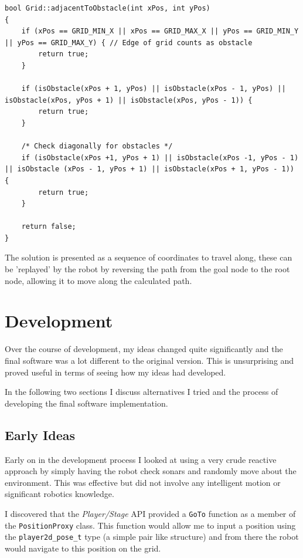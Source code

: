 \documentclass[a4paper,12pt]{article}
\begin{document}
\begin{lstlisting}
bool Grid::adjacentToObstacle(int xPos, int yPos)
{
    if (xPos == GRID_MIN_X || xPos == GRID_MAX_X || yPos == GRID_MIN_Y || yPos == GRID_MAX_Y) { // Edge of grid counts as obstacle
        return true;
    }

    if (isObstacle(xPos + 1, yPos) || isObstacle(xPos - 1, yPos) || isObstacle(xPos, yPos + 1) || isObstacle(xPos, yPos - 1)) {
        return true;
    }

    /* Check diagonally for obstacles */
    if (isObstacle(xPos +1, yPos + 1) || isObstacle(xPos -1, yPos - 1) || isObstacle (xPos - 1, yPos + 1) || isObstacle(xPos + 1, yPos - 1)) {
        return true;
    }

    return false;
}
\end{lstlisting}

The solution is presented as a sequence of coordinates to travel along, these can be 'replayed' by the robot by reversing the path from the goal node to the root node, allowing it to move along the calculated path.
\section{Development}
Over the course of development, my ideas changed quite significantly and the final software was a lot different to the original version. This is unsurprising and proved useful in terms of seeing how my ideas had developed. 

In the following two sections I discuss alternatives I tried and the process of developing the final software implementation.
\subsection{Early Ideas}
Early on in the development process I looked at using a very crude reactive approach by simply having the robot check sonars and randomly move about the environment. This was effective but did not involve any intelligent motion or significant robotics knowledge. 

I discovered that the \textit{Player/Stage} API provided a \texttt{GoTo} function as a member of the \texttt{PositionProxy} class. This function would allow me to input a position using the \texttt{player2d\_pose\_t} type (a simple pair like structure) and from there the robot would navigate to this position on the grid.
\end{document}
